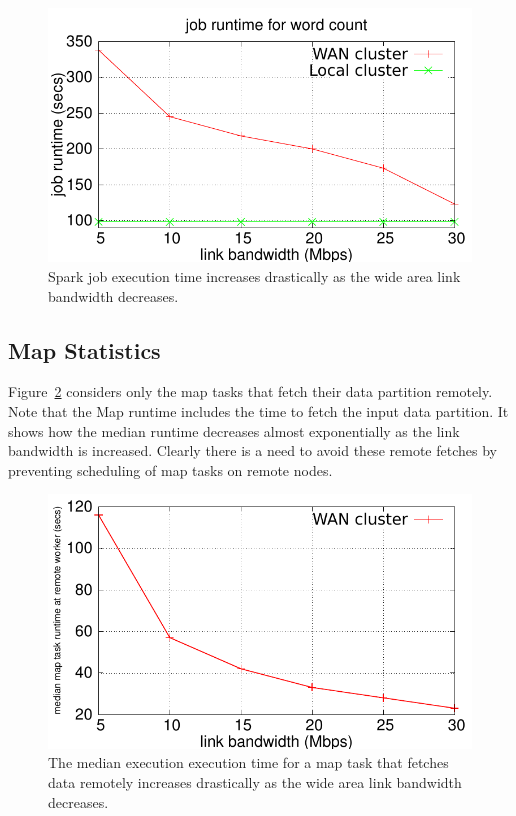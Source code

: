 \begin{figure}[!ht]
\centering\includegraphics[width=\columnwidth]{figs/job-time.pdf}
\vspace{-1.2em}
\caption{Spark job execution time increases drastically as the wide area link bandwidth decreases.}
\label{fig:job-time}
\vspace{.7em}
\end{figure}

\subsection{Map Statistics}

Figure~\ref{fig:map-time} considers only the map tasks that fetch their data partition remotely. Note that the Map runtime includes the time to fetch the input data partition. It shows how the median runtime decreases almost exponentially as the link bandwidth is increased. Clearly there is a need to avoid these remote fetches
by preventing scheduling of map tasks on remote nodes. 

\begin{figure}[!ht]
\centering\includegraphics[width=\columnwidth]{figs/map-time.pdf}
\vspace{-1.2em}
\caption{The median execution execution time for a map task that fetches data remotely increases drastically as the wide area link bandwidth decreases.}
\label{fig:map-time}
\vspace{.7em}
\end{figure}

